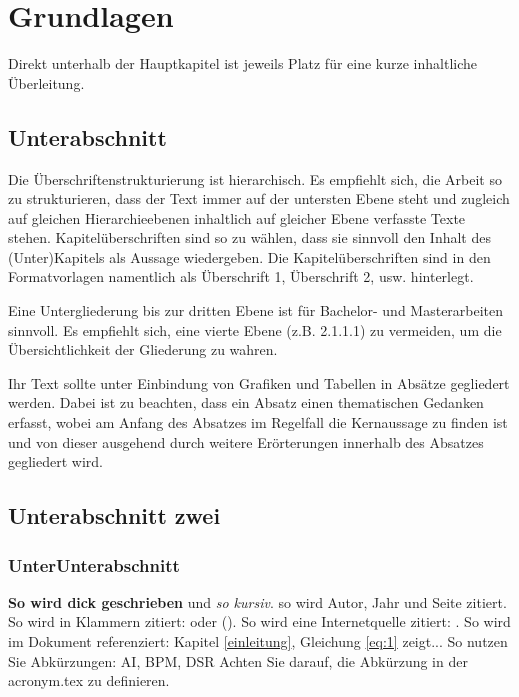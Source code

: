 \section{Grundlagen} \label{grundlagen}

Direkt unterhalb der Hauptkapitel ist jeweils Platz für eine kurze inhaltliche Überleitung.

\subsection{Unterabschnitt}

Die Überschriftenstrukturierung ist hierarchisch. Es empfiehlt sich, die Arbeit so zu strukturieren, dass der Text immer auf der untersten Ebene steht und zugleich auf gleichen Hierarchieebenen inhaltlich auf gleicher Ebene verfasste Texte stehen. Kapitelüberschriften sind so zu wählen, dass sie sinnvoll den Inhalt des (Unter)Kapitels als Aussage wiedergeben. Die Kapitelüberschriften sind in den Formatvorlagen namentlich als Überschrift 1, Überschrift 2, usw. hinterlegt.

Eine Untergliederung bis zur dritten Ebene ist für Bachelor- und Masterarbeiten sinnvoll. Es empfiehlt sich, eine vierte Ebene (z.B. 2.1.1.1) zu vermeiden, um die Übersichtlichkeit der Gliederung zu wahren.

Ihr Text sollte unter Einbindung von Grafiken und Tabellen in Absätze gegliedert werden. Dabei ist zu beachten, dass ein Absatz einen thematischen Gedanken erfasst, wobei am Anfang des Absatzes im Regelfall die Kernaussage zu finden ist und von dieser ausgehend durch weitere Erörterungen innerhalb des Absatzes gegliedert wird.

\subsection{Unterabschnitt zwei}

\subsubsection{UnterUnterabschnitt}

\textbf{So wird dick geschrieben} und \textit{so kursiv}. \citet[685]{janiesch2021machine} so wird Autor, Jahr und Seite zitiert. So wird in Klammern zitiert: \citep[685]{janiesch2021machine} oder (\cites[685]{janiesch2021machine}[289]{herm2021symbolic}). So wird eine Internetquelle zitiert: \citet{diewi}. So wird im Dokument referenziert: Kapitel \ref{einleitung}, Gleichung \ref{eq:1} zeigt...
So nutzen Sie Abkürzungen: \ac{AI}, \ac{BPM}, \ac{DSR} Achten Sie darauf, die Abkürzung in der acronym.tex zu definieren.

